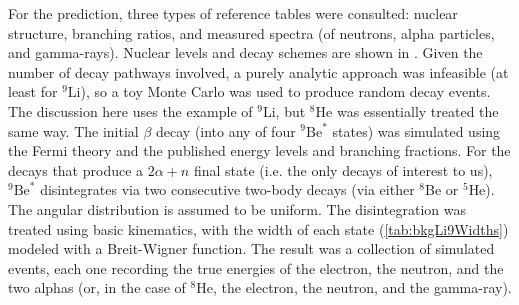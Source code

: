 \documentclass[../thesis.tex]{subfiles}
\begin{document}
\begin{comment}
An extraction of the spectrum from Daya Bay data was performed by Marshall in [YYY]. The approach takes advantage of the fact that \LiHe\ are essentially the only IBD-like events that are correlated with muons on the 100~ms timescale. A \LiHe-enriched sample was obtained by taking IBD-like events within 2---200~ms of a ``shower'' muon, here defined as one producing at least $2\times10^5$ photoelectrons. This sample contained various muon-uncorrelated ``backgrounds'', such as true IBDs and accidentals. In order to remove this contamination, a \LiHe-depleted sample was obtained by looking for IBD candidates with no preceding shower muons within 1.5~s. Before subtracting the two spectra, an appropriate normalization for the depleted sample had to be determined. This was done by performing the time-to-last-muon fit for the enriched sample, which indicated the number of true \LiHe\ events in the sample, in turn implying the number of non-\LiHe\ events. The depleted sample was thus normalized to this latter count, and the subtraction was performed, giving the results shown in Fig.~YYY.
\end{comment}

For the prediction, three types of reference tables were consulted: nuclear structure, branching ratios, and measured spectra (of neutrons, alpha particles, and gamma-rays). Nuclear levels and decay schemes are shown in . Given the number of decay pathways involved, a purely analytic approach was infeasible (at least for $^9$Li), so a toy Monte Carlo was used to produce random decay events. The discussion here uses the example of $^9$Li, but $^8$He was essentially treated the same way. The initial $\beta$ decay (into any of four $^9\mathrm{Be}^*$ states) was simulated using the Fermi theory \cite{Fermi1934TentativoDU} and the published energy levels and branching fractions. For the decays that produce a $2\alpha+n$ final state (i.e. the only decays of interest to us), $^9\mathrm{Be}^*$ disintegrates via two consecutive two-body decays (via either $^8$Be or $^5$He). The angular distribution is assumed to be uniform. The disintegration was treated using basic kinematics, with the width of each state (\autoref{tab:bkgLi9Widths}) modeled with a Breit-Wigner function. The result was a collection of simulated events, each one recording the true energies of the electron, the neutron, and the two alphas (or, in the case of $^8$He, the electron, the neutron, and the gamma-ray).
\end{document}
